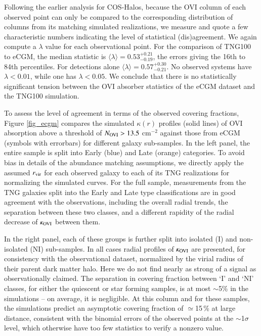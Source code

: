 \documentclass[useAMS,usenatbib]{mnras}
\newcommand{\ovi}{OVI\xspace}
\begin{document}
Following the earlier analysis for COS-Halos, because the \ovi column of each observed point can only be compared to the corresponding distribution of columns from its matching simulated realizations, we measure and quote a few characteristic numbers indicating the level of statistical (dis)agreement. We again compute a $\lambda$ value for each observational point. For the comparison of TNG100 to eCGM, the median statistic is $\langle\lambda\rangle = 0.53^{+0.21}_{-0.19}$, the errors giving the 16th to 84th percentiles. For detections alone $\langle\lambda\rangle = 0.57^{+0.30}_{-0.21}$. No observed systems have $\lambda < 0.01$, while one has $\lambda < 0.05$. We conclude that there is no statistically significant tension between the \ovi absorber statistics of the eCGM dataset and the TNG100 simulation.

To assess the level of agreement in terms of the observed covering fractions, Figure \ref{fig_ecgm} compares the simulated $\kappa(r)$ profiles (solid lines) of \ovi absorption above a threshold of $N_{\rm OVI} > 13.5$ cm$^{-2}$ against those from eCGM (symbols with errorbars) for different galaxy sub-samples. In the left panel, the entire sample is split into Early (blue) and Late (orange) categories. To avoid bias in details of the abundance matching assumptions, we directly apply the assumed $r_{\rm vir}$ for each observed galaxy to each of its TNG realizations for normalizing the simulated curves. For the full sample, measurements from the TNG galaxies split into the Early and Late type classifications are in good agreement with the observations, including the overall radial trends, the separation between these two classes, and a different rapidity of the radial decrease of $\kappa_{\rm OVI}$ between them.

In the right panel, each of these groups is further split into isolated (I) and non-isolated (NI) sub-samples. In all cases radial profiles of $\kappa_{\rm OVI}$ are presented, for consistency with the observational dataset, normalized by the virial radius of their parent dark matter halo. Here we do not find nearly as strong of a signal as observationally claimed. The separation in covering fraction between `I' and `NI' classes, for either the quiescent or star forming samples, is at most $\sim$5\% in the simulations -- on average, it is negligible. At this column and for these samples, the simulations predict an asymptotic covering fraction of $\simeq$15\,\% at large distance, consistent with the binomial errors of the observed points at the $\sim$1$\sigma$ level, which otherwise have too few statistics to verify a nonzero value.
\end{document}
